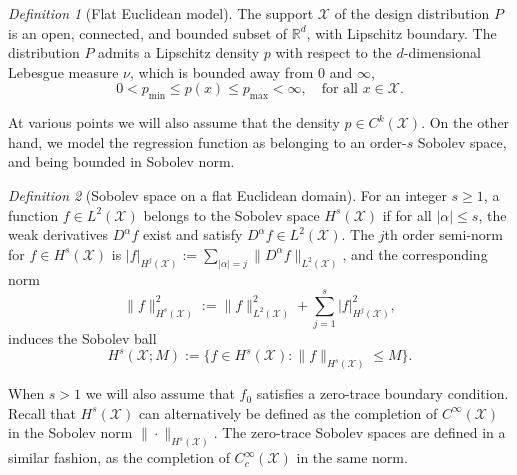 \documentclass[aos]{imsart}
\theoremstyle{plain}
\theoremstyle{definition}
\theoremstyle{remark}
\newtheorem{definition}{Definition}
\def\R{\mathbb{R}}
\newcommand{\mc}[1]{\mathcal{#1}}
\newcommand{\Reals}{\mathbb{R}} %
\newcommand{\Rd}{\Reals^d}
\newcommand{\1}{\mathbf{1}}
\begin{document}
\begin{definition}[Flat Euclidean model]
	\label{def:model_flat_euclidean}
	The support $\mc{X}$ of the design distribution $P$ is an open, connected, and bounded subset of $\Rd$, with Lipschitz boundary. The distribution $P$ admits a Lipschitz density $p$ with respect to the $d$-dimensional Lebesgue measure $\nu$, which is bounded away from $0$ and $\infty$,
	\begin{equation*}
	0 < p_{\min} \leq p(x) \leq p_{\max} < \infty, \quad \textrm{for all $x \in \mc{X}$.}
	\end{equation*}
\end{definition}
At various points we will also assume that the density $p \in C^k(\mc{X})$. On the other hand, we model the regression function as belonging to an order-$s$ Sobolev space, and being bounded in Sobolev norm.
\begin{definition}[Sobolev space on a flat Euclidean domain]
	\label{def:sobolev_space}
	For an integer $s \geq 1$, a function $f \in L^2(\mc{X})$ belongs to the Sobolev space $H^s(\mc{X})$ if for all $|\alpha| \leq s$, the weak derivatives $D^{\alpha}f$ exist and satisfy $D^{\alpha}f \in L^2(\mc{X})$. The $j$th order semi-norm for $f \in H^s(\mc{X})$ is $|f|_{H^j(\mc{X})} := \sum_{|\alpha| = j}\|D^{\alpha}f\|_{L^2(\mc{X})}$, and the corresponding norm
	\begin{equation*}
	\|f\|_{H^s(\mc{X})}^2 := \|f\|_{L^2(\mc{X})}^2 + \sum_{j = 1}^{s} |f|_{H^j(\mc{X})}^2,
	\end{equation*}
	induces the Sobolev ball
	\begin{equation*}
	H^s(\mc{X};M) := \bigl\{f \in H^s(\mc{X}): \|f\|_{H^s(\mc{X})} \leq M\bigr\}.
	\end{equation*} 
\end{definition}
When $s > 1$ we will also assume that $f_0$ satisfies a zero-trace boundary condition. Recall that $H^s(\mc{X})$ can alternatively be defined as the completion of $C^{\infty}(\mc{X})$ in the Sobolev norm $\|\cdot\|_{H^s(\mc{X})}$. The zero-trace Sobolev spaces are defined in a similar fashion, as the completion of $C_c^{\infty}(\mc{X})$ in the same norm.
\end{document}
